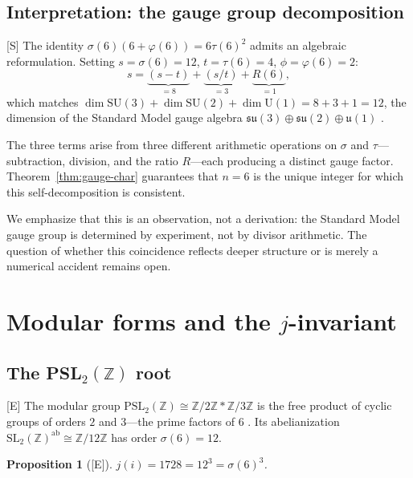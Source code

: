 \documentclass[11pt,letterpaper]{article}
\newtheorem{proposition}[theorem]{Proposition}
\theoremstyle{definition}
\theoremstyle{remark}
\newcommand{\ZZ}{\mathbb{Z}}
\newcommand{\established}{\textsf{[E]}}
\newcommand{\speculative}{\textsf{[S]}}
\begin{document}
\subsection{Interpretation: the gauge group decomposition}

\speculative{} The identity $\sigma(6)(6+\varphi(6)) = 6\tau(6)^2$ admits an 
algebraic reformulation. Setting $s = \sigma(6) = 12$, $t = \tau(6) = 4$, $\phi = \varphi(6) = 2$:
\begin{equation}\label{eq:gauge-decomp}
s = \underbrace{(s-t)}_{= 8} + \underbrace{(s/t)}_{= 3} + \underbrace{R(6)}_{= 1},
\end{equation}
which matches $\dim\mathrm{SU}(3) + \dim\mathrm{SU}(2) + \dim\mathrm{U}(1) = 8+3+1 = 12$, 
the dimension of the Standard Model gauge algebra 
$\mathfrak{su}(3) \oplus \mathfrak{su}(2) \oplus \mathfrak{u}(1)$ 
\cite{Weinberg1967,Glashow1961}.

The three terms arise from three different arithmetic operations on 
$\sigma$ and $\tau$---subtraction, division, and the ratio $R$---each producing 
a distinct gauge factor. Theorem~\ref{thm:gauge-char} guarantees that 
$n=6$ is the unique integer for which this self-decomposition is consistent.

We emphasize that this is an observation, not a derivation: the Standard Model 
gauge group is determined by experiment, not by divisor arithmetic. 
The question of whether this coincidence reflects deeper structure or is 
merely a numerical accident remains open.

\section{Modular forms and the $j$-invariant}
\label{sec:modular}

\subsection{The PSL$_2(\ZZ)$ root}

\established{} The modular group $\mathrm{PSL}_2(\ZZ) \cong \ZZ/2\ZZ * \ZZ/3\ZZ$ 
is the free product of cyclic groups of orders $2$ and $3$---the prime 
factors of $6$ \cite{Serre1973}. Its abelianization 
$\mathrm{SL}_2(\ZZ)^{\mathrm{ab}} \cong \ZZ/12\ZZ$ has order 
$\sigma(6) = 12$.

\begin{proposition}[\established]\label{prop:j-inv}
$j(i) = 1728 = 12^3 = \sigma(6)^3$.
\end{proposition}
\end{document}
